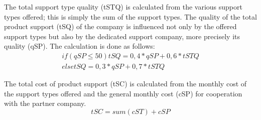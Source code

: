The total support type quality (\gls{tSTQ}) is calculated from the various support types offered; this is simply the sum of the support types. The quality of the total product support (\gls{tSQ}) of the company is influenced not only by the offered support types but also by the dedicated support company, more precisely its quality (\gls{qSP}). The calculation is done as follows:
\begin{equation}
\label{func:totalProductSupport}
\begin{aligned}
    if ( qSP ≤ 50 ) tSQ = { 0,4 *qSP + 0,6 * tSTQ } \\
    else tSQ = { 0,3 * qSP + 0,7 * tSTQ }
\end{aligned}
\end{equation}

The total cost of product support (\gls{tSC}) is calculated from the monthly cost of the support types offered and the general monthly cost (\gls{cSP}) for cooperation with the partner company.
\begin{equation}
\label{func:totalSupportCost}
    tSC = sum (cST) + cSP
\end{equation}